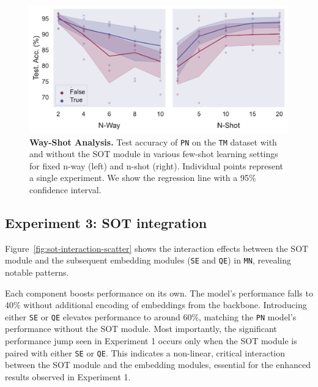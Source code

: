 \begin{figure}[h!]
    \centering
    \includegraphics[width=1\columnwidth]{../figures/way-shot.pdf}
    \caption{\textbf{Way-Shot Analysis.} Test accuracy of \texttt{PN} on the \texttt{TM} dataset with and without the SOT module in various few-shot learning settings for fixed n-way (left) and n-shot (right). Individual points represent a single experiment. We show the regression line with a 95\% confidence interval.}
    \label{fig:way-shot}
\end{figure}

\subsection{Experiment 3: SOT integration}

Figure~\ref{fig:sot-interaction-scatter} shows the interaction effects between the SOT module and the subsequent embedding modules (\texttt{SE} and \texttt{QE}) in \texttt{MN}, revealing notable patterns.

Each component boosts performance on its own. The model's performance falls to 40\% without additional encoding of embeddings from the backbone. Introducing either \texttt{SE} or \texttt{QE} elevates performance to around 60\%, matching the \texttt{PN} model's performance without the SOT module. Most importantly, the significant performance jump seen in Experiment 1 occurs only when the SOT module is paired with either \texttt{SE} or \texttt{QE}. This indicates a non-linear, critical interaction between the SOT module and the embedding modules, essential for the enhanced results observed in Experiment 1.


